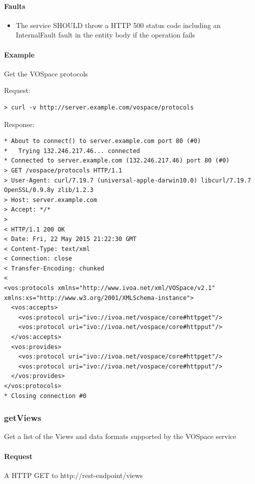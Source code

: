 \documentclass[11pt,a4paper]{ivoa}
\begin{document}
\paragraph{Faults}
\begin{itemize}
    \item The service SHOULD throw a HTTP 500 status code including an InternalFault fault in the entity body if the operation fails
\end{itemize}

\paragraph{Example}
Get the VOSpace protocols

\noindent
Request:
\begin{lstlisting}
> curl -v http://server.example.com/vospace/protocols
\end{lstlisting}
Response:
\begin{lstlisting}
* About to connect() to server.example.com port 80 (#0)
*   Trying 132.246.217.46... connected
* Connected to server.example.com (132.246.217.46) port 80 (#0)
> GET /vospace/protocols HTTP/1.1
> User-Agent: curl/7.19.7 (universal-apple-darwin10.0) libcurl/7.19.7 OpenSSL/0.9.8y zlib/1.2.3
> Host: server.example.com
> Accept: */*
>
< HTTP/1.1 200 OK
< Date: Fri, 22 May 2015 21:22:30 GMT
< Content-Type: text/xml
< Connection: close
< Transfer-Encoding: chunked
<
<vos:protocols xmlns="http://www.ivoa.net/xml/VOSpace/v2.1" xmlns:xs="http://www.w3.org/2001/XMLSchema-instance">
  <vos:accepts>
    <vos:protocol uri="ivo://ivoa.net/vospace/core#httpget"/>
    <vos:protocol uri="ivo://ivoa.net/vospace/core#httpput"/>
  </vos:accepts>
  <vos:provides>
    <vos:protocol uri="ivo://ivoa.net/vospace/core#httpget"/>
    <vos:protocol uri="ivo://ivoa.net/vospace/core#httpput"/>
  </vos:provides>
</vos:protocols>
* Closing connection #0
\end{lstlisting}

\subsubsection{getViews}
\label{subsubsec:getviews}
Get a list of the Views and data formats supported by the VOSpace service

\paragraph{Request}
A HTTP GET to http://rest-endpoint/views
\end{document}
